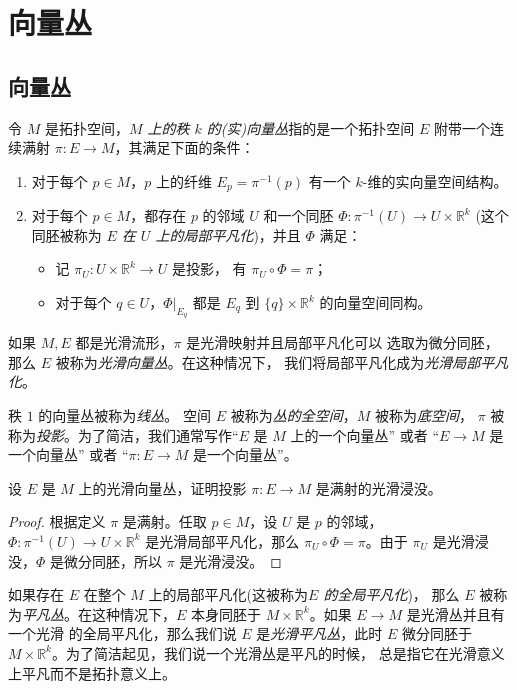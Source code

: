 

\chapter{向量丛}

\section{向量丛}

令 $M$ 是拓扑空间，\emph{$M$ 上的秩 $k$ 的(实)向量丛}指的是一个拓扑空间
$E$ 附带一个连续满射 $\pi:E\to M$，其满足下面的条件：
\begin{enumerate}
  \item 对于每个 $p\in M$，$p$ 上的纤维 $E_p=\pi^{-1}(p)$ 有一个
  $k$-维的实向量空间结构。
  \item 对于每个 $p\in M$，都存在 $p$ 的邻域 $U$ 和一个同胚
  $\varPhi:\pi^{-1}(U)\to U\times \mathbb{R}^k$ (这个同胚被称为
  \emph{$E$ 在 $U$ 上的局部平凡化})，并且 $\varPhi$ 满足：
  \begin{itemize}[nosep]
    \item 记 $\pi_U:U\times \mathbb{R}^k\to U$ 是投影，
    有 $\pi_U\circ\varPhi=\pi$；
    \item 对于每个 $q\in U$，$\varPhi|_{{E_q}}$ 都是
    $E_q$ 到 $\{q\}\times \mathbb{R}^k$ 的向量空间同构。
  \end{itemize}
\end{enumerate} 
如果 $M,E$ 都是光滑流形，$\pi$ 是光滑映射并且局部平凡化可以
选取为微分同胚，那么 $E$ 被称为\emph{光滑向量丛}。在这种情况下，
我们将局部平凡化成为\emph{光滑局部平凡化}。

秩 $1$ 的向量丛被称为\emph{线丛}。
空间 $E$ 被称为\emph{丛的全空间}，$M$ 被称为\emph{底空间}，
$\pi$ 被称为\emph{投影}。为了简洁，我们通常写作“$E$ 是 $M$ 上的一个向量丛”
或者 “$E\to M$ 是一个向量丛” 或者 “$\pi:E\to M$ 是一个向量丛”。

\begin{exercise}
  设 $E$ 是 $M$ 上的光滑向量丛，证明投影 $\pi:E\to M$
  是满射的光滑浸没。
\end{exercise}
\begin{proof}
  根据定义 $\pi$ 是满射。任取 $p\in M$，设 $U$ 是 $p$ 的邻域，
  $\varPhi:\pi^{-1}(U)\to U\times \mathbb{R}^k$ 是光滑局部平凡化，那么
  $\pi_U\circ\varPhi=\pi$。由于 $\pi_U$ 是光滑浸没，$\varPhi$
  是微分同胚，所以 $\pi$ 是光滑浸没。
\end{proof}

如果存在 $E$ 在整个 $M$ 上的局部平凡化(这被称为\emph{$E$ 的全局平凡化})，
那么 $E$ 被称为\emph{平凡丛}。在这种情况下，$E$ 本身同胚于
$M\times \mathbb{R}^k$。如果 $E\to M$ 是光滑丛并且有一个光滑
的全局平凡化，那么我们说 $E$ 是\emph{光滑平凡丛}，此时
$E$ 微分同胚于 $M\times \mathbb{R}^k$。为了简洁起见，我们说一个光滑丛是平凡的时候，
总是指它在光滑意义上平凡而不是拓扑意义上。

